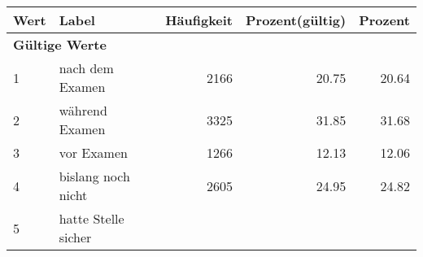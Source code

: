      \begin{longtable}{lXrrr}
     \toprule
     \textbf{Wert} & \textbf{Label} & \textbf{Häufigkeit} & \textbf{Prozent(gültig)} & \textbf{Prozent} \\
     \endhead
     \midrule
     \multicolumn{5}{l}{\textbf{Gültige Werte}}\\

     1 &
     \multicolumn{1}{X}{ nach dem Examen   } &


       \num{2166} &
       \num[round-mode=places,round-precision=2]{20.75} &
         \num[round-mode=places,round-precision=2]{20.64} \\

     2 &
     \multicolumn{1}{X}{ während Examen   } &


       \num{3325} &
       \num[round-mode=places,round-precision=2]{31.85} &
         \num[round-mode=places,round-precision=2]{31.68} \\

     3 &
     \multicolumn{1}{X}{ vor Examen   } &


       \num{1266} &
       \num[round-mode=places,round-precision=2]{12.13} &
         \num[round-mode=places,round-precision=2]{12.06} \\

     4 &
     \multicolumn{1}{X}{ bislang noch nicht   } &


       \num{2605} &
       \num[round-mode=places,round-precision=2]{24.95} &
         \num[round-mode=places,round-precision=2]{24.82} \\

     5 &
     \multicolumn{1}{X}{ hatte Stelle sicher   } &



\end{longtable}
